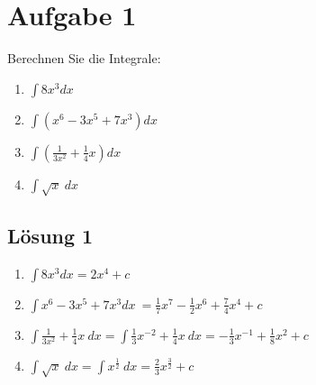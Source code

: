 \documentclass[main.tex]{subfiles}
\begin{document}
\section{Aufgabe 1}

Berechnen Sie die Integrale:
\begin{enumerate}
    \item $\int 8x^{3} dx$
    \item $\int \left( x^{6} -3x^{5} +7x^{3}\right) dx$
    \item $\int \left(\frac{1}{3x^{2}} +\frac{1}{4} x\right) dx$
    \item $\int \sqrt{x} \ dx$
\end{enumerate}

\subsection{Lösung 1}

\begin{enumerate}
    \item  $\int 8x^{3} dx=2x^{4} +c$
    \item $\int x^{6} -3x^{5} +7x^{3} dx\ =\frac{1}{7} x^{7} -\frac{1}{2} x^{6} +\frac{7}{4} x^{4} +c$
    \item $\int \frac{1}{3x^{2}} +\frac{1}{4} x\ dx=\int \frac{1}{3} x^{-2} +\frac{1}{4} x\ dx=-\frac{1}{3} x^{-1} +\frac{1}{8} x^{2} +c$
    \item $\int \sqrt{x} \ dx=\int x^{\frac{1}{2}} \ dx=\frac{2}{3} x^{\frac{3}{2}} +c$
\end{enumerate}
\end{document}
